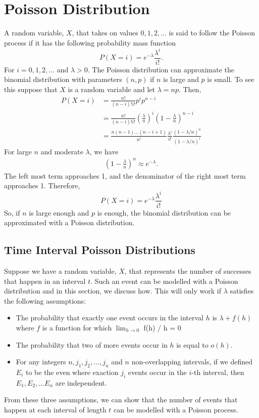 \documentclass{article}
\begin{document}
\section{Poisson Distribution}

A random variable, $X$, that takes on values $0, 1, 2, \dots$ is said to follow the Poisson process if it has the following probability mass function
\begin{equation}
    P(X = i) = e ^ {-\lambda} \frac{\lambda ^ i}{i!}.
\end{equation}
For $i = 0, 1, 2, \dots$ and $\lambda > 0$. The Poisson distribution can approximate the binomial distribution with parameters $(n, p)$ if $n$ is large and $p$ is small. To see this suppose that $X$ is a random variable and let $\lambda = np$. Then,
\begin{align*}
    P(X = i) & = \frac{n!}{(n - i)!i!} p^i p^{n - i} \\
             & = \frac{n!}{(n - i)!i!} \left( \frac{\lambda}{n} \right)^i \left( 1 - \frac{\lambda}{n} \right)^{n - i} \\
             & = \frac{n(n-1)\dots(n-i+1)}{n^i} \frac{\lambda^i}{i!} \frac{(1 - \lambda / n)^n}{(1 - \lambda / n)^i}
\end{align*}
For large $n$ and moderate $\lambda$, we have
\begin{align*}
    \left(1 - \frac{\lambda}{n}\right)^n \approx e^{-\lambda}.
\end{align*}
The left most term approaches 1, and the denominator of the right most term approaches 1. Therefore,
\begin{equation*}
    P(X = i) = e^{-\lambda} \frac{\lambda^i}{i!}
\end{equation*}
So, if $n$ is large enough and $p$ is enough, the binomial distribution can be approximated with a Poisson distribution.

\subsection{Time Interval Poisson Distributions}

Suppose we have a random variable, $X$, that represents the number of successes that happen in an interval $t$. Such an event can be modelled with a Poisson distribution and in this section, we discuss how. This will only work if $\lambda$ satisfies the following assumptions:

\begin{itemize}
\item The probability that exactly one event occurs in the interval $h$ is $\lambda + f(h)$ where $f$ is a function for which $\lim_{h \xrightarrow{} 0}$ f(h) / h = 0
\item The probability that two of more events occur in $h$ is equal to $o(h)$.
\item For any integers $n, j_1, j_2, \dots, j_n$ and $n$ non-overlapping intervals, if we defined $E_i$ to be the even where exaction $j_i$ events occur in the $i$-th interval, then $E_1, E_2, \dots E_n$ are independent.
\end{itemize}
From these three assumptions, we can show that the number of events that happen at each interval of length $t$ can be modelled with a Poisson process.
\end{document}
